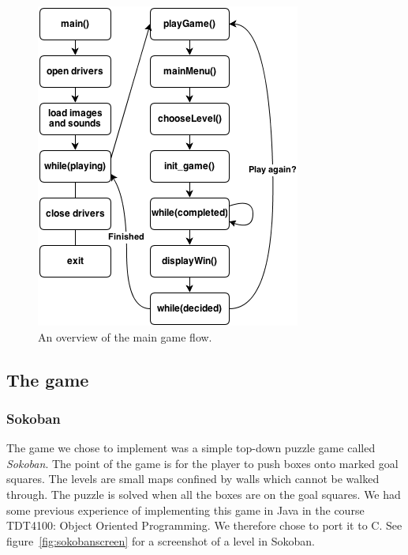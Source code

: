 \documentclass[a4paper,11pt]{article}
\begin{document}
\begin{figure}[H]
\centering
\includegraphics[scale=0.5]{images/programflow.png}
\caption{An overview of the main game flow.}
\label{fig:programflow}
\end{figure}

\subsection{The game}
\subsubsection{Sokoban}
The game we chose to implement was a simple top-down puzzle game called \textit{Sokoban}\cite{sokoban}. The point of the game is for the player to push boxes onto marked goal squares. The levels are small maps confined by walls which cannot be walked through. The puzzle is solved when all the boxes are on the goal squares. We had some previous experience of implementing this game in Java in the course TDT4100: Object Oriented Programming. We therefore chose to port it to C. See figure~\ref{fig:sokobanscreen} for a screenshot of a level in Sokoban.
\end{document}
